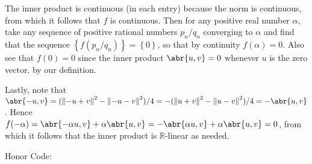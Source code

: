 \documentclass[11pt]{article}
\newcommand{\cbr}[1]{\left\{#1\right\}}
\begin{document}
\begin{enumerate}[label=\textbf{\arabic*.}]
    The inner product is continuous (in each entry) because the norm is continuous, from which it follows that $f$ is continuous. Then for any positive real number $\alpha$, take any sequence of positive rational numbers $p_n/q_n$ converging to $\alpha$ and find that the sequence $\cbr{f(p_n/q_n)} = \cbr{0}$, so that by continuity $f(\alpha) = 0$. Also see that $f(0) = 0$ since the inner product $\abr{u,v} = 0$ whenever $u$ is the zero vector, by our definition.

    Lastly, note that $\abr{-u,v} = (\norm{-u+v}^2 - \norm{-u-v}^2)/4 = -(\norm{u+v}^2 - \norm{u-v}^2)/4 = -\abr{u,v}$. Hence $f(-\alpha) = \abr{-\alpha u, v}+\alpha\abr{u,v} = -\abr{\alpha u, v}+\alpha\abr{u,v} = 0$, from which it follows that the inner product is $\mathbb R$-linear as needed.

    \hrulefill
\end{enumerate}
Honor Code: \vspace*{7em}
\end{document}
